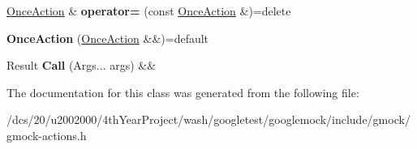 \begin{DoxyCompactItemize}
\mbox{\hyperlink{classtesting_1_1OnceAction}{Once\+Action}} \& {\bfseries operator=} (const \mbox{\hyperlink{classtesting_1_1OnceAction}{Once\+Action}} \&)=delete
\item 
\mbox{\label{classtesting_1_1OnceAction_3_01Result_07Args_8_8_8_08_4_a059ac54d55b016e53e62d4593454a8d2}} 
{\bfseries Once\+Action} (\mbox{\hyperlink{classtesting_1_1OnceAction}{Once\+Action}} \&\&)=default
\item 
\mbox{\label{classtesting_1_1OnceAction_3_01Result_07Args_8_8_8_08_4_a2879dbd872e4821a4688e32f23de458f}} 
Result {\bfseries Call} (Args... args) \&\&
\end{DoxyCompactItemize}


The documentation for this class was generated from the following file\+:\begin{DoxyCompactItemize}
\item 
/dcs/20/u2002000/4th\+Year\+Project/wash/googletest/googlemock/include/gmock/gmock-\/actions.\+h\end{DoxyCompactItemize}
